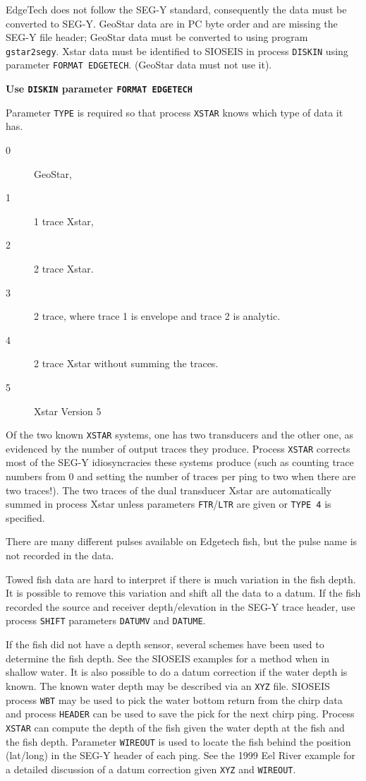 EdgeTech does not follow the SEG-Y standard, consequently the
data must be converted to SEG-Y.  GeoStar data are in PC byte order
and are missing the SEG-Y file header; GeoStar data must be converted
to using program \texttt{gstar2segy}.  Xstar data must be identified to SIOSEIS
in process \texttt{DISKIN} using parameter \texttt{FORMAT EDGETECH}.
(GeoStar data must not use it).

\textbf{Use \texttt{DISKIN} parameter     \texttt{FORMAT EDGETECH}}

     Parameter \texttt{TYPE} is required so that process \texttt{XSTAR} knows which
type of data it has.
\begin{description}
\item[0] GeoStar,
\item[1] 1 trace Xstar,
\item[2] 2 trace Xstar.
\item[3] 2 trace, where trace 1 is envelope and trace 2 is analytic.
\item[4] 2 trace Xstar without summing the traces.
\item[5] Xstar Version 5
\end{description}

     Of the two known \texttt{XSTAR} systems, one has two transducers and
the other one, as evidenced by the number of output traces they
produce.  Process \texttt{XSTAR} corrects most of the SEG-Y idiosyncracies
these systems produce (such as counting trace numbers from 0 and
setting the number of traces per ping to two when there are two
traces!).  The two traces of the dual transducer Xstar are
automatically summed in process Xstar unless parameters \texttt{FTR}/\texttt{LTR}
are given or \texttt{TYPE 4} is specified.

     There are many different pulses available on Edgetech
fish, but the pulse name is not recorded in the data.

     Towed fish data are hard to interpret if there is much
variation in the fish depth.  It is possible to remove this
variation and shift all the data to a datum.  If the fish
recorded the source and receiver depth/elevation in the SEG-Y
trace header, use process \texttt{SHIFT} parameters \texttt{DATUMV} and \texttt{DATUME}.

     If the fish did not have a depth sensor, several schemes
have been used to determine the fish depth.  See the SIOSEIS
examples for a method when in shallow water.  It is also possible
to do a datum correction if the water depth is known.  The
known water depth may be described via an \texttt{XYZ} file.  SIOSEIS
process \texttt{WBT} may be used to pick the water bottom return from
the chirp data and process \texttt{HEADER} can be used to save the pick
for the next chirp ping.  Process \texttt{XSTAR} can compute the depth
of the fish given the water depth at the fish and the fish
depth.  Parameter \texttt{WIREOUT} is used to locate the fish behind
the position (lat/long) in the SEG-Y header of each ping.  See
the 1999 Eel River example for a detailed discussion of a datum
correction given \texttt{XYZ} and \texttt{WIREOUT}.

